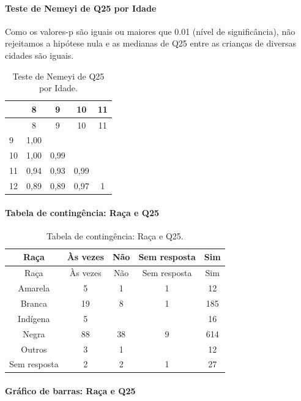 \documentclass[]{article}
\let\oldparagraph\paragraph
\renewcommand{\paragraph}[1]{\oldparagraph{#1}\mbox{}}
\begin{document}
\hypertarget{teste-de-nemeyi-de-q25-por-idade}{%
\paragraph{Teste de Nemeyi de Q25 por Idade}\label{teste-de-nemeyi-de-q25-por-idade}}

Como os valores-p são iguais ou maiores que 0.01 (nível de significância), não rejeitamos a hipótese nula e as medianas de Q25 entre as crianças de diversas cidades são iguais.

\begin{longtable}[]{@{}lcccc@{}}
\caption{\label{tab:unnamed-chunk-690}Teste de Nemeyi de Q25 por Idade.}\tabularnewline
\toprule
& 8 & 9 & 10 & 11\tabularnewline
\midrule
\endfirsthead
\toprule
& 8 & 9 & 10 & 11\tabularnewline
\midrule
\endhead
9 & 1,00 & & &\tabularnewline
10 & 1,00 & 0,99 & &\tabularnewline
11 & 0,94 & 0,93 & 0,99 &\tabularnewline
12 & 0,89 & 0,89 & 0,97 & 1\tabularnewline
\bottomrule
\end{longtable}

\cleardoublepage

\hypertarget{tabela-de-continguxeancia-rauxe7a-e-q25}{%
\paragraph{Tabela de contingência: Raça e Q25}\label{tabela-de-continguxeancia-rauxe7a-e-q25}}

\begin{longtable}[]{@{}ccccc@{}}
\caption{\label{tab:unnamed-chunk-691}Tabela de contingência: Raça e Q25.}\tabularnewline
\toprule
Raça & Às vezes & Não & Sem resposta & Sim\tabularnewline
\midrule
\endfirsthead
\toprule
Raça & Às vezes & Não & Sem resposta & Sim\tabularnewline
\midrule
\endhead
Amarela & 5 & 1 & 1 & 12\tabularnewline
Branca & 19 & 8 & 1 & 185\tabularnewline
Indígena & 5 & & & 16\tabularnewline
Negra & 88 & 38 & 9 & 614\tabularnewline
Outros & 3 & 1 & & 12\tabularnewline
Sem resposta & 2 & 2 & 1 & 27\tabularnewline
\bottomrule
\end{longtable}

\hypertarget{gruxe1fico-de-barras-rauxe7a-e-q25}{%
\paragraph{Gráfico de barras: Raça e Q25}\label{gruxe1fico-de-barras-rauxe7a-e-q25}}
\end{document}
